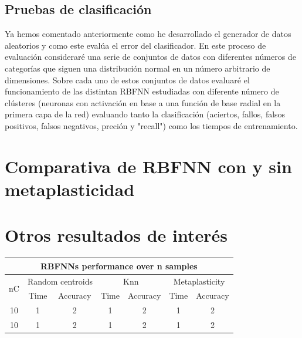 \documentclass[10pt,a4paper, twocolumn]{report}
\begin{document}
\subsection{Pruebas de clasificación}
Ya hemos comentado anteriormente como he desarrollado el generador de datos aleatorios y como este evalúa el error del clasificador. En este proceso de evaluación consideraré una serie de conjuntos de datos con diferentes números de categorías que siguen una distribución normal en un número arbitrario de dimensiones. Sobre cada uno de estos conjuntos de datos evaluaré el funcionamiento de las distintan RBFNN estudiadas con diferente número de clústeres (neuronas con activación en base a una función de base radial en la primera capa de la red) evaluando tanto la clasificación (aciertos, fallos, falsos positivos, falsos negativos, preción y "recall") como los tiempos de entrenamiento.

\section{Comparativa de RBFNN con y sin metaplasticidad}
\section{Otros resultados de interés}

\onecolumn
\begin{center}\begin{tabular}{|c|c|c|c|c|c|c|}
	\hline
	\multicolumn{7}{|c|}{RBFNNs performance over n samples} \\
	\hline
	\multirow{2}{*}{nC} & \multicolumn{2}{|c|}{Random centroids} & \multicolumn{2}{|c|}{Knn} & \multicolumn{2}{|c|}{Metaplasticity} \\
	& Time & Accuracy & Time & Accuracy & Time & Accuracy \\
	\hline
	10 & 1 & 2 & 1 & 2 & 1 & 2 \\
	10 & 1 & 2 & 1 & 2 & 1 & 2 \\
	\hline
\end{tabular}\end{center}
\twocolumn
\end{document}
